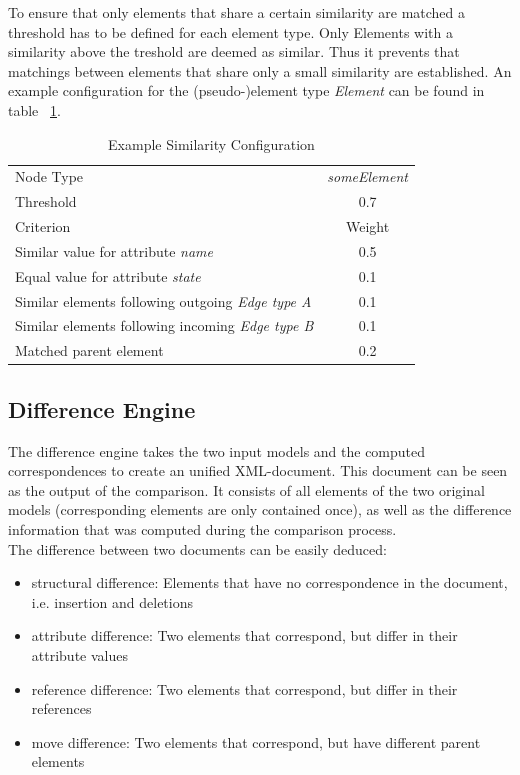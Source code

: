 \documentclass{article}
\begin{document}
To ensure that only elements that share a certain similarity are matched a 
threshold has to be defined for each element type. Only Elements with a similarity above the treshold are deemed as similar. Thus it prevents that matchings 
between elements that share only a small similarity are established. An example configuration for the (pseudo-)element type \textit{Element} can be 
found in table ~\ref{tabsimconfig}. \\

\begin{table} [h]
\centering
\begin{tabular} {l | c}
\hline
Node Type & \textit{someElement} \\
Threshold & 0.7 \\ \hline \hline

Criterion & Weight \\
\hline
Similar value for attribute \textit{name} & 0.5 \\
Equal value for attribute \textit{state} & 0.1 \\
Similar elements following outgoing \textit{Edge type A} & 0.1 \\
Similar elements following incoming \textit{Edge type B} & 0.1 \\
Matched parent element & 0.2 \\
\end{tabular}
\caption{Example Similarity Configuration}
\label{tabsimconfig}
\end{table}

\subsection{Difference Engine}
\label{secunidoc}
The difference engine takes the two input models and the computed correspondences to create an unified XML-document. This document can be seen as 
the output of the comparison. It consists of all elements of the two original models (corresponding elements are only contained once), as well 
as the difference information that was computed during the comparison process.\\

The difference between two documents can be easily deduced: 
\begin{itemize}
\item structural difference: Elements that have no correspondence in the document, i.e. insertion and deletions
\item attribute difference: Two elements that correspond, but differ in their attribute values
\item reference difference: Two elements that correspond, but differ in their references
\item move difference: Two elements that correspond, but have different parent elements 
\end{itemize}
\end{document}
